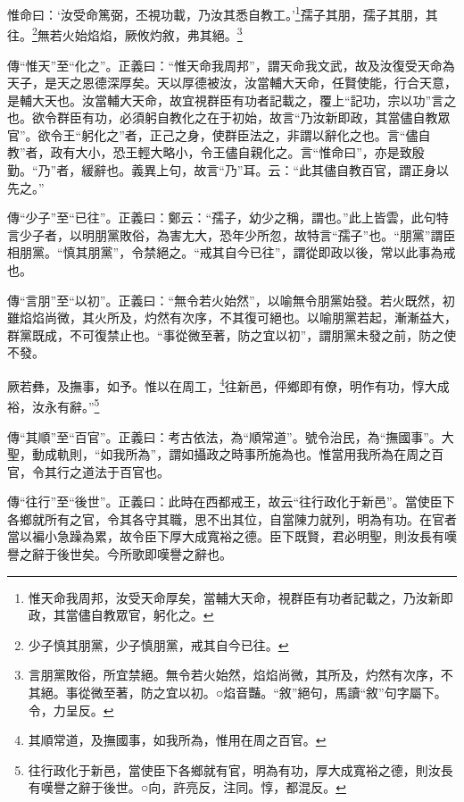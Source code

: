惟命曰：‘汝受命篤弼，丕視功載，乃汝其悉自教工。’\footnote{惟天命我周邦，汝受天命厚矣，當輔大天命，視群臣有功者記載之，乃汝新即政，其當儘自教眾官，躬化之。}孺子其朋，孺子其朋，其往。\footnote{少子慎其朋黨，少子慎朋黨，戒其自今已往。}無若火始焰焰，厥攸灼敘，弗其絕。\footnote{言朋黨敗俗，所宜禁絕。無令若火始然，焰焰尚微，其所及，灼然有次序，不其絕。事從微至著，防之宜以初。○焰音豔。“敘”絕句，馬讀“敘”句字屬下。令，力呈反。}


{\noindent\zhuan{}\fzbyks 傳“惟天”至“化之”。正義曰：“惟天命我周邦”，謂天命我文武，故及汝復受天命為天子，是天之恩德深厚矣。天以厚德被汝，汝當輔大天命，任賢使能，行合天意，是輔大天也。汝當輔大天命，故宜視群臣有功者記載之，覆上“記功，宗以功”言之也。欲令群臣有功，必須躬自教化之在于初始，故言“乃汝新即政，其當儘自教眾官”。欲令王“躬化之”者，正己之身，使群臣法之，非謂以辭化之也。言“儘自教”者，政有大小，恐王輕大略小，令王儘自親化之。言“惟命曰”，亦是致殷勤。“乃”者，緩辭也。義異上句，故言“乃”耳。云：“此其儘自教百官，謂正身以先之。” \par}

{\noindent\zhuan{}\fzbyks 傳“少子”至“已往”。正義曰：鄭云：“孺子，幼少之稱，謂也。”此上皆雲，此句特言少子者，以明朋黨敗俗，為害尢大，恐年少所忽，故特言“孺子”也。“朋黨”謂臣相朋黨。“慎其朋黨”，令禁絕之。“戒其自今已往”，謂從即政以後，常以此事為戒也。 \par}

{\noindent\zhuan{}\fzbyks 傳“言朋”至“以初”。正義曰：“無令若火始然”，以喻無令朋黨始發。若火既然，初雖焰焰尚微，其火所及，灼然有次序，不其復可絕也。以喻朋黨若起，漸漸益大，群黨既成，不可復禁止也。“事從微至著，防之宜以初”，謂朋黨未發之前，防之使不發。 \par}

厥若彝，及撫事，如予。惟以在周工，\footnote{其順常道，及撫國事，如我所為，惟用在周之百官。}往新邑，伻鄉即有僚，明作有功，惇大成裕，汝永有辭。”\footnote{往行政化于新邑，當使臣下各鄉就有官，明為有功，厚大成寬裕之德，則汝長有嘆譽之辭于後世。○向，許亮反，注同。惇，都混反。}

{\noindent\zhuan{}\fzbyks 傳“其順”至“百官”。正義曰：考古依法，為“順常道”。號令治民，為“撫國事”。大聖，動成軌則，“如我所為”，謂如攝政之時事所施為也。惟當用我所為在周之百官，令其行之道法于百官也。 \par}

{\noindent\zhuan{}\fzbyks 傳“往行”至“後世”。正義曰：此時在西都戒王，故云“往行政化于新邑”。當使臣下各鄉就所有之官，令其各守其職，思不出其位，自當陳力就列，明為有功。在官者當以褊小急躁為累，故令臣下厚大成寬裕之德。臣下既賢，君必明聖，則汝長有嘆譽之辭于後世矣。今所歌即嘆譽之辭也。 \par}

